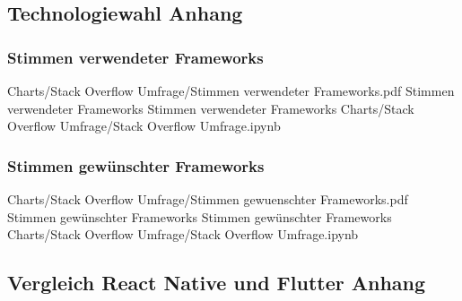 \subsection{Technologiewahl Anhang} 

\subsubsection{Stimmen verwendeter Frameworks} 

\begin{alexfigurewithnotebook}{Charts/Stack Overflow Umfrage/Stimmen verwendeter Frameworks.pdf}
	{Stimmen verwendeter Frameworks}
	{Stimmen verwendeter Frameworks}
	{Charts/Stack Overflow Umfrage/Stack Overflow Umfrage.ipynb}
	{}
	\label{fig:StimmenVerwendeterFrameworks}
\end{alexfigurewithnotebook}


\subsubsection{Stimmen gewünschter Frameworks} 


\begin{alexfigurewithnotebook}{Charts/Stack Overflow Umfrage/Stimmen gewuenschter Frameworks.pdf}
	{Stimmen gewünschter Frameworks}
	{Stimmen gewünschter Frameworks}
	{Charts/Stack Overflow Umfrage/Stack Overflow Umfrage.ipynb}
	{}
	\label{fig:StimmenGewuenschterFrameworks}
\end{alexfigurewithnotebook}
 


\subsection{Vergleich React Native und Flutter Anhang} 
 


 




